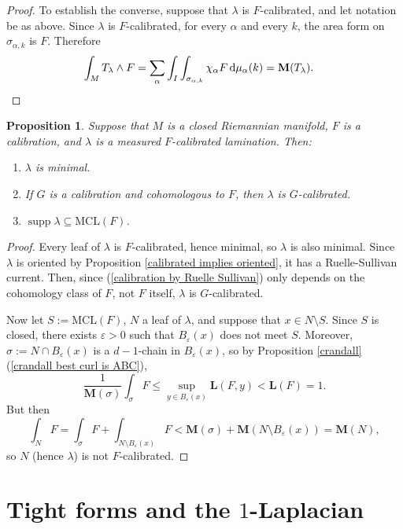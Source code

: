 \documentclass[reqno,11pt]{amsart}
\newcommand*\dif{\mathop{}\!\mathrm{d}}
\DeclareMathOperator{\supp}{supp}
\newcommand{\MCL}{\mathrm{MCL}}
\newcommand{\Mass}{\mathbf M}
\newcommand{\Comass}{\mathbf L}
\newtheorem{proposition}[theorem]{Proposition}
\theoremstyle{definition}
\numberwithin{equation}{section}
\begin{document}
\begin{proof}
To establish the converse, suppose that $\lambda$ is $F$-calibrated, and let notation be as above.
Since $\lambda$ is $F$-calibrated, for every $\alpha$ and every $k$, the area form on $\sigma_{\alpha, k}$ is $F$. Therefore
\begin{align*}
\int_M T_\lambda \wedge F &= \sum_\alpha \int_I \int_{\sigma_{\alpha, k}} \chi_\alpha F \dif \mu_\alpha(k) = \Mass(T_\lambda). \qedhere
\end{align*}
\end{proof}

\begin{proposition}\label{properties of calibrated laminations}
Suppose that $M$ is a closed Riemannian manifold, $F$ is a calibration, and $\lambda$ is a measured $F$-calibrated lamination.
Then:
\begin{enumerate}
\item $\lambda$ is minimal.
\item If $G$ is a calibration and cohomologous to $F$, then $\lambda$ is $G$-calibrated.
\item $\supp \lambda \subseteq \MCL(F)$.
\end{enumerate}
\end{proposition}
\begin{proof}
Every leaf of $\lambda$ is $F$-calibrated, hence minimal, so $\lambda$ is also minimal.
Since $\lambda$ is oriented by Proposition \ref{calibrated implies oriented}, it has a Ruelle-Sullivan current.
Then, since (\ref{calibration by Ruelle Sullivan}) only depends on the cohomology class of $F$, not $F$ itself, $\lambda$ is $G$-calibrated.

Now let $S := \MCL(F)$, $N$ a leaf of $\lambda$, and suppose that $x \in N \setminus S$.
Since $S$ is closed, there exists $\varepsilon > 0$ such that $B_\varepsilon(x)$ does not meet $S$.
Moreover, $\sigma := N \cap B_\varepsilon(x)$ is a $d-1$-chain in $B_\varepsilon(x)$, so by Proposition \ref{crandall}(\ref{crandall best curl is ABC}),
$$\frac{1}{\Mass(\sigma)} \int_\sigma F \leq \sup_{y \in B_\varepsilon(x)} \Comass(F, y) < \Comass(F) = 1.$$
But then 
$$\int_N F = \int_\sigma F + \int_{N \setminus B_\varepsilon(x)} F < \Mass(\sigma) + \Mass(N \setminus B_\varepsilon(x)) = \Mass(N),$$
so $N$ (hence $\lambda$) is not $F$-calibrated.
\end{proof}

\section{\texorpdfstring{Tight forms and the $1$-Laplacian}{Infinity-tight forms and the one-Laplacian}}\label{tight forms sec}
\end{document}
